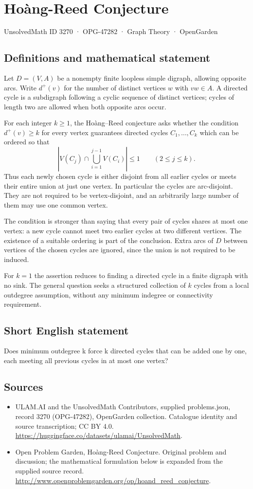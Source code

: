 \documentclass[11pt,a4paper]{article}
\begin{document}
\section*{Hoàng-Reed Conjecture}\label{3270}
{\small UnsolvedMath ID 3270 · OPG-47282 · Graph Theory · OpenGarden}
\subsection{Definitions and mathematical statement}
Let $D=(V,A)$ be a nonempty finite loopless simple digraph, allowing opposite
arcs. Write $d^+(v)$ for the number of distinct vertices $w$ with
$vw\in A$. A directed cycle is a subdigraph following a cyclic sequence
of distinct vertices; cycles of length two are allowed when both
opposite arcs occur.

For each integer $k\ge1$, the Hoàng--Reed conjecture asks whether the
condition $d^+(v)\ge k$ for every vertex guarantees directed cycles
$C_1,\ldots,C_k$ which can be ordered so that
\[
 \left|V(C_j)\cap\bigcup_{i=1}^{j-1}V(C_i)\right|\le1
                         \qquad(2\le j\le k).
\]
Thus each newly chosen cycle is either disjoint from all earlier cycles
or meets their entire union at just one vertex. In particular the
cycles are arc-disjoint. They are not required to be vertex-disjoint,
and an arbitrarily large number of them may use one common vertex.

The condition is stronger than saying that every pair of cycles shares
at most one vertex: a new cycle cannot meet two earlier cycles at two
different vertices. The existence of a suitable ordering is part of
the conclusion. Extra arcs of $D$ between vertices of the chosen cycles
are ignored, since the union is not required to be induced.

For $k=1$ the assertion reduces to finding a directed cycle in a finite
digraph with no sink. The general question seeks a structured collection
of $k$ cycles from a local outdegree assumption, without any minimum
indegree or connectivity requirement.
\subsection{Short English statement}
Does minimum outdegree k force k directed cycles that can be added one by one, each meeting all previous cycles in at most one vertex?
\subsection{Sources}
\begin{itemize}
\item[S1] ULAM.AI and the UnsolvedMath Contributors, supplied problems.json, record 3270 (OPG-47282), OpenGarden collection. Catalogue identity and source transcription; CC BY 4.0.
\url{https://huggingface.co/datasets/ulamai/UnsolvedMath}.
\item[S2] Open Problem Garden, Hoàng-Reed Conjecture. Original problem and discussion; the mathematical formulation below is expanded from the supplied source record.
\url{http://www.openproblemgarden.org/op/hoand_reed_conjecture}.
\end{itemize}
\end{document}
